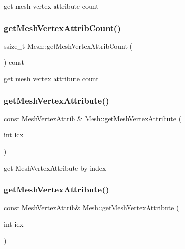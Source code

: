get mesh vertex attribute count \mbox{\label{classMesh_afc2d755d1c586b16983e951d1c0af38b}} 
\subsubsection{\texorpdfstring{get\+Mesh\+Vertex\+Attrib\+Count()}{getMeshVertexAttribCount()}\hspace{0.1cm}{\footnotesize\ttfamily [2/2]}}
{\footnotesize\ttfamily ssize\+\_\+t Mesh\+::get\+Mesh\+Vertex\+Attrib\+Count (\begin{DoxyParamCaption}{ }\end{DoxyParamCaption}) const}

get mesh vertex attribute count \mbox{\label{classMesh_a8ff20e7d894aa8aeca8f16bbd16f6bc4}} 
\subsubsection{\texorpdfstring{get\+Mesh\+Vertex\+Attribute()}{getMeshVertexAttribute()}\hspace{0.1cm}{\footnotesize\ttfamily [1/2]}}
{\footnotesize\ttfamily const \hyperlink{structMeshVertexAttrib}{Mesh\+Vertex\+Attrib} \& Mesh\+::get\+Mesh\+Vertex\+Attribute (\begin{DoxyParamCaption}\item[{int}]{idx }\end{DoxyParamCaption})}

get Mesh\+Vertex\+Attribute by index \mbox{\label{classMesh_a3f74344b90bbb184d016767a10b17ef3}} 
\subsubsection{\texorpdfstring{get\+Mesh\+Vertex\+Attribute()}{getMeshVertexAttribute()}\hspace{0.1cm}{\footnotesize\ttfamily [2/2]}}
{\footnotesize\ttfamily const \hyperlink{structMeshVertexAttrib}{Mesh\+Vertex\+Attrib}\& Mesh\+::get\+Mesh\+Vertex\+Attribute (\begin{DoxyParamCaption}\item[{int}]{idx }\end{DoxyParamCaption})}

